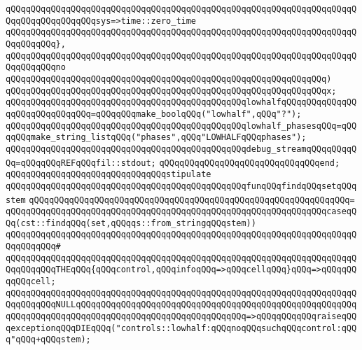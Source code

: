\verb|qQQqqQQqqQQqqQQqqQQqqQQqqQQqqQQqqQQqqQQqqQQqqQQqqQQqqQQqqQQqqQQqqQQqqQQqqQQqqQQqqQQqqQQqsys=>time::zero_time|\newline
\verb|qQQqqQQqqQQqqQQqqQQqqQQqqQQqqQQqqQQqqQQqqQQqqQQqqQQqqQQqqQQqqQQqqQQqqQQqqQQqqQQq},|\newline
\verb|qQQqqQQqqQQqqQQqqQQqqQQqqQQqqQQqqQQqqQQqqQQqqQQqqQQqqQQqqQQqqQQqqQQqqQQqqQQqqQQqno|\newline
\verb|qQQqqQQqqQQqqQQqqQQqqQQqqQQqqQQqqQQqqQQqqQQqqQQqqQQqqQQqqQQqqQQq)|\newline
\verb|qQQqqQQqqQQqqQQqqQQqqQQqqQQqqQQqqQQqqQQqqQQqqQQqqQQqqQQqqQQqqQQqx;|\newline
\newline
\verb|qQQqqQQqqQQqqQQqqQQqqQQqqQQqqQQqqQQqqQQqqQQqqQQqlowhalfqQQqqQQqqQQqqQQqqQQqqQQqqQQqqQQq=qQQqqQQqmake_boolqQQq("lowhalf",qQQq"?");|\newline
\verb|qQQqqQQqqQQqqQQqqQQqqQQqqQQqqQQqqQQqqQQqqQQqqQQqlowhalf_phasesqQQq=qQQqqQQqmake_string_listqQQq("phases",qQQq"LOWHALFqQQqphases");|\newline
\verb|qQQqqQQqqQQqqQQqqQQqqQQqqQQqqQQqqQQqqQQqqQQqqQQqdebug_streamqQQqqQQqqQQq=qQQqqQQqREFqQQqfil::stdout;|\newline
\newline
\verb|qQQqqQQqqQQqqQQqqQQqqQQqqQQqqQQqend;|\newline
\newline
\verb|qQQqqQQqqQQqqQQqqQQqqQQqqQQqqQQqstipulate|\newline
\verb|qQQqqQQqqQQqqQQqqQQqqQQqqQQqqQQqqQQqqQQqqQQqqQQqfunqQQqfindqQQqsetqQQqstem|\newline
\verb|qQQqqQQqqQQqqQQqqQQqqQQqqQQqqQQqqQQqqQQqqQQqqQQqqQQqqQQqqQQqqQQq=|\newline
\verb|qQQqqQQqqQQqqQQqqQQqqQQqqQQqqQQqqQQqqQQqqQQqqQQqqQQqqQQqqQQqqQQqcaseqQQq(cst::findqQQq(set,qQQqqs::from_stringqQQqstem))|\newline
\verb|qQQqqQQqqQQqqQQqqQQqqQQqqQQqqQQqqQQqqQQqqQQqqQQqqQQqqQQqqQQqqQQqqQQqqQQqqQQqqQQq#|\newline
\verb|qQQqqQQqqQQqqQQqqQQqqQQqqQQqqQQqqQQqqQQqqQQqqQQqqQQqqQQqqQQqqQQqqQQqqQQqqQQqqQQqTHEqQQq{qQQqcontrol,qQQqinfoqQQq=>qQQqcellqQQq}qQQq=>qQQqqQQqqQQqcell;|\newline
\verb|qQQqqQQqqQQqqQQqqQQqqQQqqQQqqQQqqQQqqQQqqQQqqQQqqQQqqQQqqQQqqQQqqQQqqQQqqQQqqQQqNULLqQQqqQQqqQQqqQQqqQQqqQQqqQQqqQQqqQQqqQQqqQQqqQQqqQQqqQQqqQQqqQQqqQQqqQQqqQQqqQQqqQQqqQQqqQQqqQQqqQQqqQQq=>qQQqqQQqqQQqraiseqQQqexceptionqQQqDIEqQQq("controls::lowhalf:qQQqnoqQQqsuchqQQqcontrol:qQQq"qQQq+qQQqstem);|\newline
